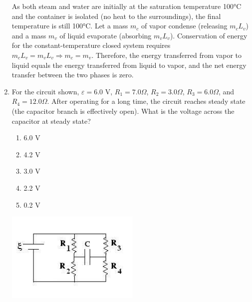 \documentclass[12pt, a4paper]{article}
\begin{document}
\begin{CJK*}{UTF8}{gbsn}
\begin{enumerate}[itemsep=1.0em, topsep=0.6em]
\begin{solutionbox}
As both steam and water are initially at the saturation temperature 100°C and the container is isolated (no heat to the surroundings), the final temperature is still 100°C. Let a mass $m_c$ of vapor condense (releasing $m_cL_v$) and a mass $m_v$ of liquid evaporate (absorbing $m_vL_v$). Conservation of energy for the constant-temperature closed system requires $m_cL_v=m_vL_v\Rightarrow m_c=m_v$. Therefore, the energy transferred from vapor to liquid equals the energy transferred from liquid to vapor, and the net energy transfer between the two phases is zero.
\end{solutionbox}

\newpage

\item \label{prob:7}
\noindent\begin{minipage}[t]{0.6\linewidth}
\vspace{0pt}
For the circuit shown, $\varepsilon = 6.0$ V, $R_1 = 7.0 \Omega$, $R_2 = 3.0 \Omega$, $R_3 = 6.0 \Omega$, and $R_4 = 12.0 \Omega$. After operating for a long time, the circuit reaches steady state (the capacitor branch is effectively open). What is the voltage across the capacitor at steady state?
\begin{enumerate}[label=(\Alph*)]
    \item 6.0 V
    \item 4.2 V
    \item 3.0 V
    \item 2.2 V
    \item 0.2 V
\end{enumerate}
\end{minipage}%
\hfill
\begin{minipage}[t]{0.33\linewidth}
\vspace{0pt}
\centering
\includegraphics[width=\linewidth]{Problem_07_Figure.png}
\end{minipage}


\end{enumerate}
\end{CJK*}
\end{document}
